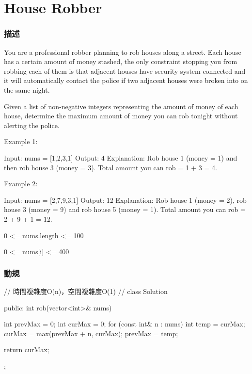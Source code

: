 \section{House Robber} %
\label{sec:house-robber}


\subsubsection{描述}
You are a professional robber planning to rob houses along a street. Each house has a certain amount of money stashed, the only constraint stopping you from robbing each of them is that adjacent houses have security system connected and it will automatically contact the police if two adjacent houses were broken into on the same night.

Given a list of non-negative integers representing the amount of money of each house, determine the maximum amount of money you can rob tonight without alerting the police.

Example 1:
\begin{Code}
Input: nums = [1,2,3,1]
Output: 4
Explanation: Rob house 1 (money = 1) and then rob house 3 (money = 3).
             Total amount you can rob = 1 + 3 = 4.
\end{Code}

Example 2:
\begin{Code}
Input: nums = [2,7,9,3,1]
Output: 12
Explanation: Rob house 1 (money = 2), rob house 3 (money = 9) and rob house 5 (money = 1).
             Total amount you can rob = 2 + 9 + 1 = 12.
\end{Code}

\begindot
\item 0 <= nums.length <= 100
\item 0 <= nums[i] <= 400
\myenddot

\subsubsection{動規}
\begin{Code}
// 時間複雜度O(n)，空間複雜度O(1)
//
class Solution {
public:
    int rob(vector<int>& nums) {
        int prevMax = 0;
        int curMax = 0;
        for (const int& n : nums)
        {
            int temp = curMax;
            curMax = max(prevMax + n, curMax);
            prevMax = temp;
        }

        return curMax;
    }
};
\end{Code}


